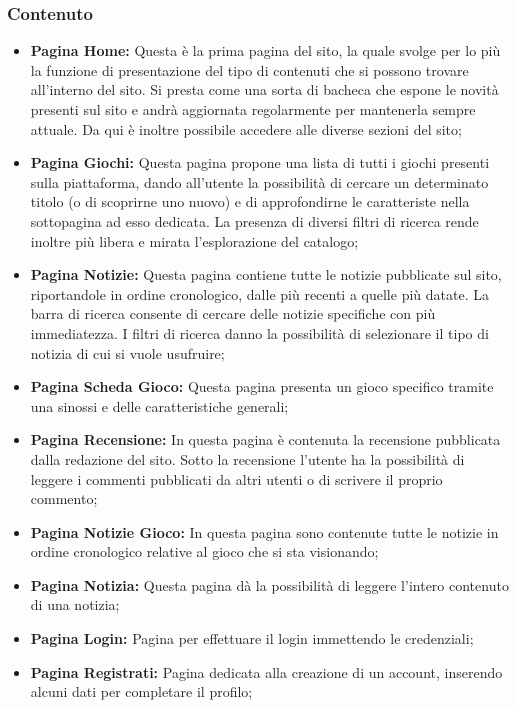 \subsubsection{Contenuto}

\begin{itemize}
	\item \textbf{Pagina Home:} Questa è la prima pagina del sito, la quale svolge per lo più la funzione di presentazione del tipo di contenuti che si possono trovare all'interno del sito.
Si presta come una sorta di bacheca che espone le novità presenti sul sito e andrà aggiornata regolarmente per mantenerla sempre attuale. Da qui è inoltre possibile accedere alle diverse sezioni del sito;
	\item \textbf{Pagina Giochi:} Questa pagina propone una lista di tutti i giochi presenti sulla piattaforma, dando all'utente la possibilità di cercare un determinato titolo (o di scoprirne uno nuovo) e di approfondirne le caratteriste nella sottopagina ad esso dedicata. La presenza di diversi filtri di ricerca rende inoltre più libera e mirata l'esplorazione del catalogo;
	\item \textbf{Pagina Notizie:} Questa pagina contiene tutte le notizie pubblicate sul sito, riportandole in ordine cronologico, dalle più recenti a quelle più datate. La barra di ricerca consente di cercare delle notizie specifiche con più immediatezza. I filtri di ricerca danno la possibilità di selezionare il tipo di notizia di cui si vuole usufruire;
	\item \textbf{Pagina Scheda Gioco:} Questa pagina presenta un gioco specifico tramite una sinossi e delle caratteristiche generali;	
	\item \textbf{Pagina Recensione:} In questa pagina è contenuta la recensione pubblicata dalla redazione del sito. Sotto la recensione l'utente ha la possibilità di leggere i commenti pubblicati da altri utenti o di scrivere il proprio commento;
	\item \textbf{Pagina Notizie Gioco:} In questa pagina sono contenute tutte le notizie in ordine cronologico relative al gioco che si sta visionando;
	\item \textbf{Pagina Notizia:} Questa pagina dà la possibilità di leggere l'intero contenuto di una notizia;
	\item \textbf{Pagina Login:} Pagina per effettuare il login immettendo le credenziali;
	\item \textbf{Pagina Registrati:} Pagina dedicata alla creazione di un account, inserendo alcuni dati per completare il profilo;

\end{itemize}
